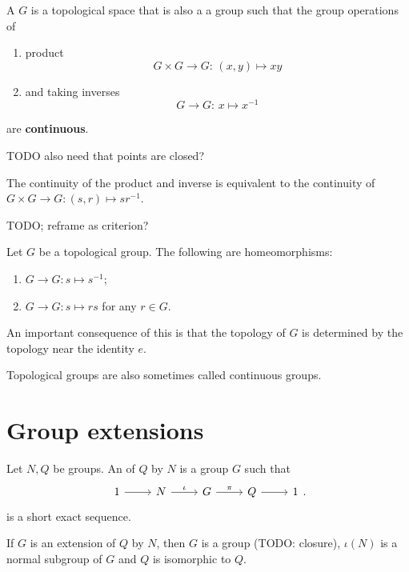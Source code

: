 \begin{definition}
A  $G$ is a topological space that is also a a group such that the group operations of
\begin{enumerate}
\item product
\[ G\times G \to G: \, (x,y)\mapsto xy \]
\item and taking inverses
\[ G\to G: \, x\mapsto x^{-1} \]
\end{enumerate}
are \textbf{continuous}.
\end{definition}
TODO also need that points are closed?

\begin{lemma}
The continuity of the product and inverse is equivalent to the continuity of $G\times G \to G: (s,r)\mapsto sr^{-1}$.
\end{lemma}
TODO; reframe as criterion?

\begin{lemma}
Let $G$ be a topological group. The following are homeomorphisms:
\begin{enumerate}
\item $G\to G: s\mapsto s^{-1}$;
\item $G\to G: s\mapsto rs$ for any $r\in G$.
\end{enumerate}
\end{lemma}
An important consequence of this is that the topology of $G$ is determined by the topology near the identity $e$.

Topological groups are also sometimes called continuous groups.


\section{Group extensions}
\begin{definition}
Let $N,Q$ be groups. An  of $Q$ by $N$ is a group $G$ such that
\[
\begin{tikzcd}
1 \ar[r] & N \ar[r, "\iota"] & G \ar[r, "\pi"] & Q \ar[r] & 1
\end{tikzcd}.
\]
is a short exact sequence.
\end{definition}
\begin{lemma}
If $G$ is an extension of $Q$ by $N$, then $G$ is a group (TODO: closure), $\iota(N)$ is a normal subgroup of $G$ and $Q$ is isomorphic to $Q$.
\end{lemma}

